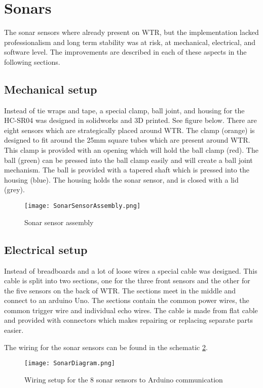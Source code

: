 
\section{Sonars}
The sonar sensors where already present on WTR, but the implementation lacked professionalism and long term stability was at risk, at mechanical, electrical, and software level.
The improvements are described in each of these aspects in the following sections.

\subsection{Mechanical setup}
Instead of tie wraps and tape, a special clamp, ball joint, and housing for the HC-SR04 was designed in solidworks and 3D printed. See figure below.
There are eight sensors which are strategically placed around WTR.
The clamp (orange) is designed to fit around the 25mm square tubes which are present around WTR. 
This clamp is provided with an opening which will hold the ball clamp (red).
The ball (green) can be pressed into the ball clamp easily and will create a ball joint mechanism.
The ball is provided with a tapered shaft which is pressed into the housing (blue).
The housing holds the sonar sensor, and is closed with a lid (grey).

\begin{figure}[H]
\centering
\texttt{[image: SonarSensorAssembly.png]}
\caption{Sonar sensor assembly}
\label{fig::sonarassembly}
\end{figure}


\subsection{Electrical setup}
Instead of breadboards and a lot of loose wires a special cable was designed. 
This cable is split into two sections, one for the three front sensors and the other for the five sensors on the back of WTR.
The sections meet in the middle and connect to an arduino Uno.
The sections contain the common power wires, the common trigger wire and individual echo wires.
The cable is made from flat cable and provided with connectors which makes repairing or replacing separate parts easier.

The wiring for the sonar sensors can be found in the schematic \ref{fig::wiringsonar}.

\begin{figure}[H]
\centering
\texttt{[image: SonarDiagram.png]}
\caption{Wiring setup for the 8 sonar sensors to Arduino communication}
\label{fig::wiringsonar}
\end{figure}

 
\newpage    